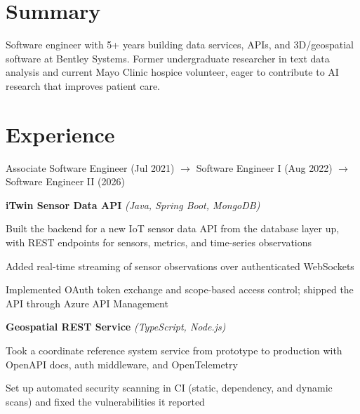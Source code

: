 \documentclass[]{deedy-resume-openfont}
\begin{document}
\hfill
%
%
\begin{minipage}[t]{0.66\textwidth}


\section{Summary}
Software engineer with 5+ years building data services, APIs, and 3D/geospatial software at Bentley Systems. Former undergraduate researcher in text data analysis and current Mayo Clinic hospice volunteer, eager to contribute to AI research that improves patient care.
\sectionsep


\section{Experience}

Associate Software Engineer (Jul 2021) $\rightarrow$ Software Engineer I (Aug 2022) $\rightarrow$ Software Engineer II (2026)
\vspace{6pt}


{\bf iTwin Sensor Data API} \textit{(Java, Spring Boot, MongoDB)}
\vspace{\topsep}
\begin{tightemize}
\item Built the backend for a new IoT sensor data API from the database layer up, with REST endpoints for sensors, metrics, and time-series observations
\item Added real-time streaming of sensor observations over authenticated WebSockets
\item Implemented OAuth token exchange and scope-based access control; shipped the API through Azure API Management
\end{tightemize}
\vspace{4pt}

{\bf Geospatial REST Service} \textit{(TypeScript, Node.js)}
\begin{tightemize}
\item Took a coordinate reference system service from prototype to production with OpenAPI docs, auth middleware, and OpenTelemetry
\item Set up automated security scanning in CI (static, dependency, and dynamic scans) and fixed the vulnerabilities it reported
\end{tightemize}
\vspace{4pt}


\end{minipage}
\end{document}
